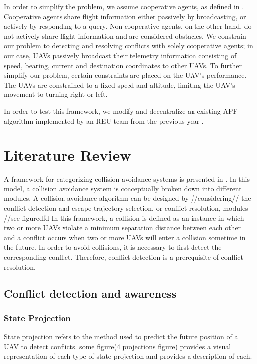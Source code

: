 \documentclass[conference]{IEEEtran}
\begin{document}
In order to simplify the problem, we assume cooperative agents, as defined in \cite{roadmap2002roadmap}. Cooperative agents share flight information either passively by broadcasting, or actively by responding to a query. Non cooperative agents, on the other hand, do not actively share flight information and are considered obstacles. We constrain our problem to detecting and resolving conflicts with solely cooperative agents; in our case, UAVs passively broadcast their telemetry information consisting of speed, bearing, current and destination coordinates to other UAVs. To further simplify our problem, certain constraints are placed on the UAV’s performance.  The UAVs are constrained to a fixed speed and altitude, limiting the UAV’s movement to turning right or left. 

In order to test this framework, we modify and decentralize an existing APF algorithm implemented by an REU team from the previous year \cite{siudynamic}.


\section{Literature Review}
\label{sec:litReview}
A framework for categorizing collision avoidance systems is presented in \cite{albaker2009survey}.  In this model, a collision avoidance system is conceptually broken down into different modules.  A collision avoidance algorithm can be designed by //considering// the conflict detection and escape trajectory selection, or conflict resolution, modules //see figuredfd  In this framework, a collision is defined as an instance in which two or more UAVs violate a minimum separation distance between each other and a conflict occurs when two or more UAVs will enter a collision sometime in the future. In order to avoid collisions, it is necessary to first detect the corresponding conflict.  Therefore, conflict detection is a prerequisite of conflict resolution.

\subsection{Conflict detection and awareness}


\subsubsection{State Projection}
State projection refers to the method used to predict the future position of a UAV to detect conflicts. some figure(4 projections figure) provides a visual representation of each type of state projection and \cite{albaker2009survey} provides a description of each.
\end{document}
